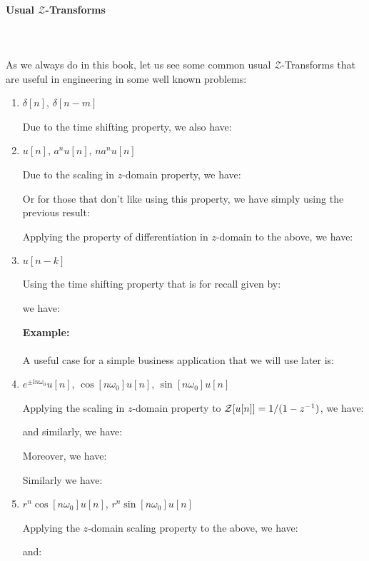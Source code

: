 	\paragraph{Usual $\mathcal{Z}$-Transforms}\mbox{}\\\\
	As we always do in this book, let us see some common usual  $\mathcal{Z}$-Transforms that are useful in engineering in some well known problems:
	\begin{enumerate}

		\item $\delta[n]$, $\delta[n-m]$
		
		Due to the time shifting property, we also have:
		
		
		\item $u[n]$, $a^n u[n]$, $n a^n u[n]$
		
		
		Due to the scaling in $z$-domain property, we have:
		
		Or for those that don't like using this property, we have simply using the previous result:
		
		Applying the property of differentiation in $z$-domain to the above, we have:
		
		
		\item $u[n-k]$

		Using the time shifting property that is for recall given by:
		
		we have:
		
		\begin{tcolorbox}[colframe=black,colback=white,sharp corners]
		\textbf{{\Large {}}Example:}\\\\
		A useful case for a simple business application that we will use later is:
		
		\end{tcolorbox}
		
		\item $e^{\pm \mathrm{i}n\omega_0}u[n]$, $\cos[n\omega_0]u[n]$, $\sin[n\omega_0]u[n]$
		
		Applying the scaling in $z$-domain property to ${\cal Z}[u[n]]=1/(1-z^{-1})$, we have:
		
		and similarly, we have:
		
		Moreover, we have:
		
		Similarly we have:
		
		
		\item $r^n \cos[n\omega_0]u[n]$, $r^n \sin[n\omega_0]u[n]$
		
		Applying the $z$-domain scaling property to the above, we have:
		
		and:
		
	\end{enumerate}
